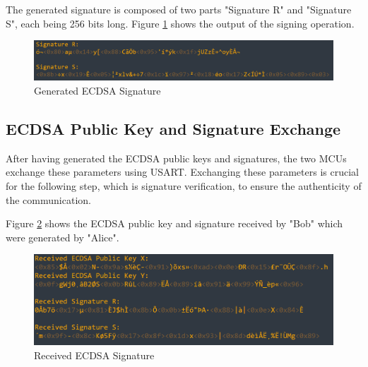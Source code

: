     The generated signature is composed of two parts "Signature R" and "Signature S", each being 256 bits long. Figure \ref{fig:ecdsa_rs} shows the output of the signing operation.
    
    \begin{figure}[H]
    \centering
    \includegraphics[width=17cm]{img/signature rs.png}
    \caption{Generated ECDSA Signature}
    \label{fig:ecdsa_rs}
    \end{figure}

    \subsection{ECDSA Public Key and Signature Exchange}
    After having generated the ECDSA public keys and signatures, the two MCUs exchange these parameters using USART. Exchanging these parameters is crucial for the following step, which is signature verification, to ensure the authenticity of the communication.
    
    Figure \ref{fig:received sign} shows the ECDSA public key and signature received by "Bob" which were generated by "Alice". 
    \begin{figure}[H]
    \centering
    \includegraphics[width=16cm]{img/received sigpub.png}
    \caption{Received ECDSA Signature}
    \label{fig:received sign}
    \end{figure}

